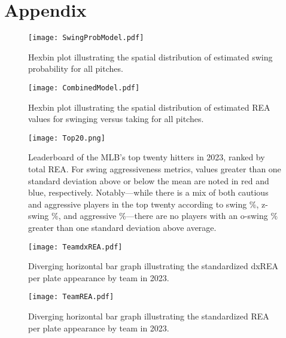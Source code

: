 \documentclass[12pt]{article}
\numberwithin{equation}{section}
\begin{document}
\clearpage

\appendix
\section*{Appendix}

\begin{figure}[H]
    \centering
    \texttt{[image: SwingProbModel.pdf]}
    \captionsetup{font=small, width=0.9\linewidth}
    \caption{Hexbin plot illustrating the spatial distribution of estimated swing probability for all pitches.}
    \label{fig:SwingProbAllCounts}
\end{figure}

\begin{figure}[H]
    \centering
    \texttt{[image: CombinedModel.pdf]}
    \captionsetup{font=small, width=0.9\linewidth}
    \caption{Hexbin plot illustrating the spatial distribution of estimated REA values for swinging versus taking for all pitches.}
    \label{fig:REAAllCounts}
\end{figure}

\begin{figure}[H]
    \centering
    \texttt{[image: Top20.png]}
    \captionsetup{font=small, width=0.9\linewidth}
    \caption{Leaderboard of the MLB’s top twenty hitters in 2023, ranked by total REA. For swing aggressiveness metrics, values greater than one standard deviation above or below the mean are noted in red and blue, respectively. Notably---while there is a mix of both cautious and aggressive players in the top twenty according to swing $\%$, z-swing $\%$, and aggressive $\%$---there are no players with an o-swing $\%$ greater than one standard deviation above average.}
    \label{fig:Leaderboard}
\end{figure}

\begin{figure}[H]
    \centering
    \texttt{[image: TeamdxREA.pdf]}
    \captionsetup{font=small, width=0.9\linewidth}
    \caption{Diverging horizontal bar graph illustrating the standardized dxREA per plate appearance by team in 2023.}
    \label{fig:TeamxREA}
\end{figure}

\begin{figure}[H]
    \centering
    \texttt{[image: TeamREA.pdf]}
    \captionsetup{font=small, width=0.9\linewidth}
    \caption{Diverging horizontal bar graph illustrating the standardized REA per plate appearance by team in 2023.}
    \label{fig:TeamREA}
\end{figure}
\end{document}
